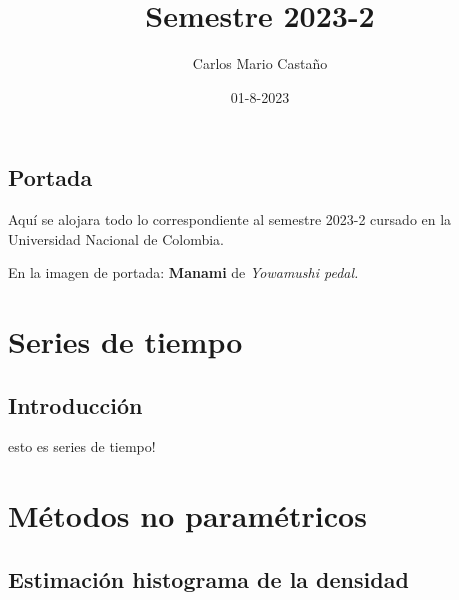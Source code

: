 \documentclass[
  letterpaper,
  DIV=11,
  numbers=noendperiod]{scrreprt}
\title{Semestre 2023-2}
\author{Carlos Mario Castaño}
\date{01-8-2023}
\renewcommand*\contentsname{Tabla de contenido}
\newcommand\contentsname{Tabla de contenido}
\begin{document}
\maketitle
\ifdefined\Shaded\renewenvironment{Shaded}{\begin{tcolorbox}[boxrule=0pt, breakable, interior hidden, borderline west={3pt}{0pt}{shadecolor}, sharp corners, enhanced, frame hidden]}{\end{tcolorbox}}\fi

\renewcommand*\contentsname{Tabla de contenido}
{
\hypersetup{linkcolor=}
\setcounter{tocdepth}{2}
\tableofcontents
}

\hypertarget{portada}{%
\chapter*{Portada}\label{portada}}


Aquí se alojara todo lo correspondiente al semestre 2023-2 cursado en la
Universidad Nacional de Colombia.

En la imagen de portada: \textbf{Manami} de \emph{Yowamushi pedal.}

\part{Series de tiempo}

\hypertarget{introducciuxf3n}{%
\chapter{Introducción}\label{introducciuxf3n}}

esto es series de tiempo!

\part{Métodos no paramétricos}

\hypertarget{estimaciuxf3n-histograma-de-la-densidad}{%
\chapter{Estimación histograma de la
densidad}\label{estimaciuxf3n-histograma-de-la-densidad}}

\newcommand{\lr}[1]{\left(#1\right)}
\newcommand{\var}[1]{\textrm{Var}\left[#1\right]}
\newcommand{\esp}[1]{\textrm{E}\left[#1\right]}
\newcommand{\rm}[1]{\textrm{#1}}
\end{document}
